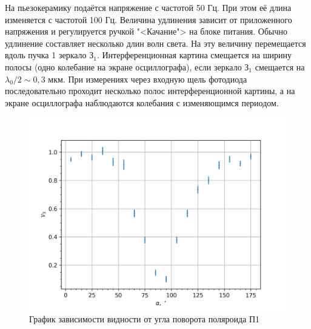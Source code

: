 \documentclass[12pt]{article}
\begin{document}
    На пьезокерамику подаётся напряжение с частотой 50 Гц. При этом
    её длина изменяется с частотой 100 Гц. Величина удлинения зависит от
    приложенного напряжения и регулируется ручкой "<Качание"> на блоке
    питания. Обычно удлинение составляет несколько длин волн света. На
    эту величину перемещается вдоль пучка 1 зеркало $ \text{З}_1 $. Интерференционная картина смещается на ширину полосы (одно колебание на экране осциллографа), если зеркало $ \text{З}_1 $ смещается на $ \lambda_0 /2 \sim 0,3 $ мкм. При
    измерениях через входную щель фотодиода последовательно проходит
    несколько полос интерференционной картины, а на экране осциллографа наблюдаются колебания с изменяющимся периодом.

    \begin{figure}[b]
        \centering
        \includegraphics[width=0.9\linewidth]{pic/V(a)}
        \caption{График зависимости видности от угла поворота поляроида П1}
        \label{fig:fig3}
    \end{figure}
\end{document}
